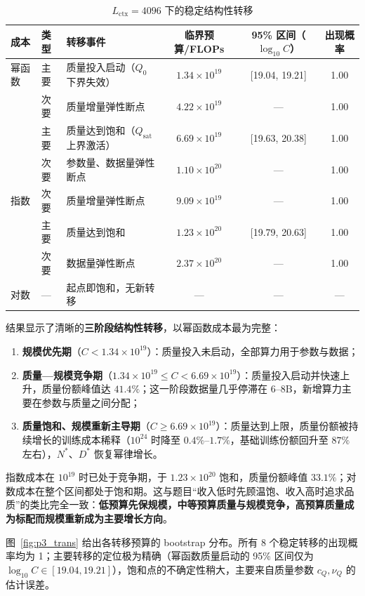 \begin{table}[htbp]
\centering
\small
\caption{$L_{\mathrm{ctx}}=4096$ 下的稳定结构性转移}
\label{tab:p3_trans}
\setlength{\tabcolsep}{4pt}
\begin{tabular}{lllccc}
\toprule
成本 & 类型 & 转移事件 & 临界预算/FLOPs & 95\% 区间（$\log_{10}C$） & 出现概率 \\
\midrule
幂函数 & 主要 & 质量投入启动（$Q_0$ 下界失效） & $1.34\times10^{19}$ & [19.04, 19.21] & 1.00 \\
 & 次要 & 质量增量弹性断点 & $4.22\times10^{19}$ & — & 1.00 \\
 & 主要 & 质量达到饱和（$Q_{\mathrm{sat}}$ 上界激活） & $6.69\times10^{19}$ & [19.63, 20.38] & 1.00 \\
 & 次要 & 参数量、数据量弹性断点 & $1.10\times10^{20}$ & — & 1.00 \\
\midrule
指数 & 次要 & 质量增量弹性断点 & $9.09\times10^{19}$ & — & 1.00 \\
 & 主要 & 质量达到饱和 & $1.23\times10^{20}$ & [19.79, 20.63] & 1.00 \\
 & 次要 & 数据量弹性断点 & $2.37\times10^{20}$ & — & 1.00 \\
\midrule
对数 & — & 起点即饱和，无新转移 & — & — & — \\
\bottomrule
\end{tabular}
\end{table}

结果显示了清晰的\textbf{三阶段结构性转移}，以幂函数成本最为完整：
\begin{enumerate}
\item \textbf{规模优先期}（$C<1.34\times10^{19}$）：质量投入未启动，全部算力用于参数与数据；
\item \textbf{质量—规模竞争期}（$1.34\times10^{19}\le C<6.69\times10^{19}$）：质量投入启动并快速上升，质量份额峰值达 $41.4\%$；这一阶段数据量几乎停滞在 $6$--$8\mathrm{B}$，新增算力主要在参数与质量之间分配；
\item \textbf{质量饱和、规模重新主导期}（$C\ge6.69\times10^{19}$）：质量达到上限，质量份额被持续增长的训练成本稀释（$10^{24}$ 时降至 $0.4\%$--$1.7\%$，基础训练份额回升至 $87\%$ 左右），$N^*$、$D^*$ 恢复幂律增长。
\end{enumerate}
指数成本在 $10^{19}$ 时已处于竞争期，于 $1.23\times10^{20}$ 饱和，质量份额峰值 $33.1\%$；对数成本在整个区间都处于饱和期。这与题目“收入低时先顾温饱、收入高时追求品质”的类比完全一致：\textbf{低预算先保规模，中等预算质量与规模竞争，高预算质量成为标配而规模重新成为主要增长方向}。

图~\ref{fig:p3_trans} 给出各转移预算的 bootstrap 分布。所有 8 个稳定转移的出现概率均为 1；主要转移的定位极为精确（幂函数质量启动的 95\% 区间仅为 $\log_{10}C\in[19.04,19.21]$），饱和点的不确定性稍大，主要来自质量参数 $c_Q,\nu_Q$ 的估计误差。

